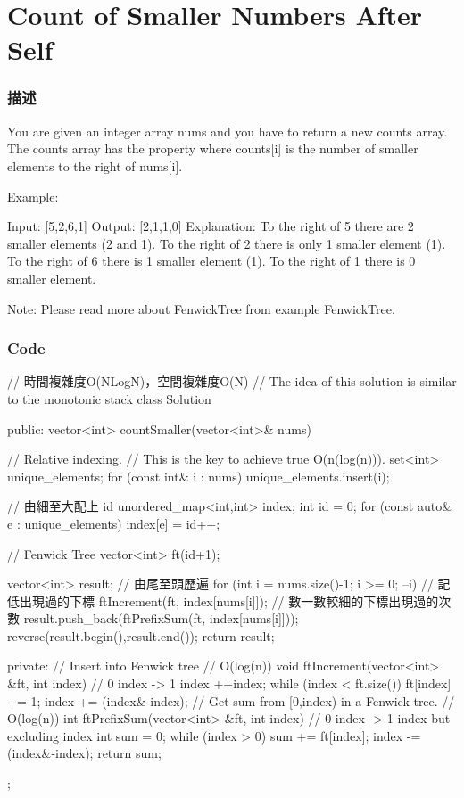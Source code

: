 \section{Count of Smaller Numbers After Self} %
\label{sec:count-of-smaller-numbers-after-self}

\subsubsection{描述}
You are given an integer array nums and you have to return a new counts array. The counts array has the property where counts[i] is the number of smaller elements to the right of nums[i].

Example:
\begin{Code}
Input: [5,2,6,1]
Output: [2,1,1,0]
Explanation:
To the right of 5 there are 2 smaller elements (2 and 1).
To the right of 2 there is only 1 smaller element (1).
To the right of 6 there is 1 smaller element (1).
To the right of 1 there is 0 smaller element.
\end{Code}

Note:
Please read more about FenwickTree from example FenwickTree.

\subsubsection{Code}
\begin{Code}
// 時間複雜度O(NLogN)，空間複雜度O(N)
// The idea of this solution is similar to the monotonic stack
class Solution {
public:
    vector<int> countSmaller(vector<int>& nums)
    {
        // Relative indexing.
        // This is the key to achieve true O(n(log(n))).
        set<int> unique_elements;
        for (const int& i : nums) unique_elements.insert(i);

        // 由細至大配上 id
        unordered_map<int,int> index;
        int id = 0;
        for (const auto& e : unique_elements) index[e] = id++;

        // Fenwick Tree
        vector<int> ft(id+1);

        vector<int> result;
        // 由尾至頭歷遍
        for (int i = nums.size()-1; i >= 0; --i)
        {
            // 記低出現過的下標
            ftIncrement(ft, index[nums[i]]);
            // 數一數較細的下標出現過的次數
            result.push_back(ftPrefixSum(ft, index[nums[i]]));
        }
        reverse(result.begin(),result.end());
        return result;
    }
private:
    // Insert into Fenwick tree
    // O(log(n))
    void ftIncrement(vector<int> &ft, int index)
    {
        // 0 index -> 1 index
        ++index;
        while (index < ft.size())
        {
            ft[index] += 1;
            index += (index&-index);
        }
    }
    // Get sum from [0,index) in a Fenwick tree.
    // O(log(n))
    int ftPrefixSum(vector<int> &ft, int index)
    {
        // 0 index -> 1 index but excluding index
        int sum = 0;
        while (index > 0)
        {
            sum += ft[index];
            index -= (index&-index);
        }
        return sum;
    }
};
\end{Code}

